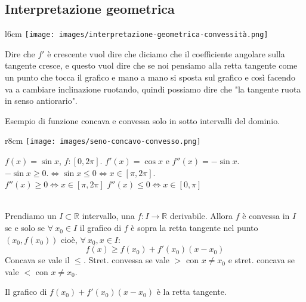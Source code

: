 \subsection{Interpretazione geometrica}
\begin{wrapfigure}[7]{l}{6cm}
    \vspace{-13pt}
    \centering
    \texttt{[image: images/interpretazione-geometrica-convessità.png]}
\end{wrapfigure}
Dire che $f'$ è crescente vuol dire che diciamo che il coefficiente angolare sulla tangente cresce, e questo vuol dire che se noi pensiamo alla retta tangente come un punto che tocca il grafico e mano a mano si sposta sul grafico e così facendo va a cambiare inclinazione ruotando, quindi possiamo dire che "la tangente ruota in senso antiorario".\\
\newpage
\begin{example}
Esempio di funzione concava e convessa solo in sotto intervalli del dominio.
\end{example}
\begin{wrapfigure}[4]{r}{8cm}
    \vspace{-10pt}
    \centering
    \texttt{[image: images/seno-concavo-convesso.png]}
\end{wrapfigure}

$f(x) = \sin{x}$, $f: [0, 2\pi]$. $f'(x) = \cos{x}$ e $f''(x) = -\sin{x}$.\\
$-\sin{x} \geq 0. \Longleftrightarrow \sin{x} \leq 0 \Longleftrightarrow x \in [\pi, 2\pi]$.\\
$f''(x) \geq 0 \Longleftrightarrow x \in [\pi, 2\pi]$ \hspace{.5cm} $f''(x) \leq 0 \Longleftrightarrow x \in [0, \pi]$\\\\

\begin{proposition}
Prendiamo un $I \subset \mathbb{R}$ intervallo, una $f: I \to \mathbb{R}$ derivabile. Allora $f$ è convessa in $I$ se e solo se $\forall \: x_0 \in I$ il grafico di $f$ è sopra la retta tangente nel punto $(x_0, f(x_0))$ cioè, $\forall \: x_0, x\in I$:
\[f(x) \geq f(x_0) + f'(x_0)(x-x_0)\]
Concava se vale il $\leq$. Stret. convessa se vale $>$ con $x \neq x_0$ e stret. concava se vale $<$ con $x\neq x_0$.
\end{proposition}

\begin{note}
Il grafico  di $f(x_0) + f'(x_0)(x-x_0)$ è la retta tangente.
\end{note}

